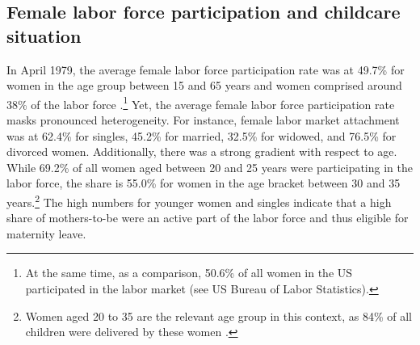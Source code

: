 \documentclass[11pt, a4paper]{article} %
\begin{document}
\subsection{Female labor force participation and childcare situation}
In April 1979, the average female labor force participation rate was at 49.7\% for women in the age group between 15 and 65 years and women comprised around 38\% of the labor force \citep{federalstatisticaloffice1981yearbook}.\footnote{At the same time, as a comparison, 50.6\% of all women in the US participated in the labor market (see US Bureau of Labor Statistics).} Yet, the average female labor force participation rate masks pronounced heterogeneity. For instance, female labor market attachment was at 62.4\% for singles, 45.2\% for married, 32.5\% for widowed, and 76.5\% for divorced women. Additionally, there was a strong gradient with respect to age. While 69.2\% of all women aged between 20 and 25 years were participating in the labor force, the share is 55.0\% for women in the age bracket between 30 and 35 years.\footnote{Women aged 20 to 35 are the relevant age group in this context, as 84\% of all children were delivered by these women \citep{federalstatisticaloffice1981yearbook}.} The high numbers for younger women and singles indicate that a high share of mothers-to-be were an active part of the labor force and thus eligible for maternity leave. \newline 
\end{document}
